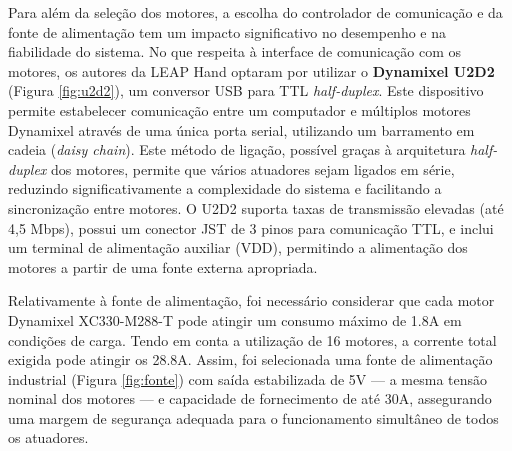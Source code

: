 Para além da seleção dos motores, a escolha do controlador de comunicação e da fonte de alimentação tem um impacto significativo no desempenho e na fiabilidade do sistema. No que respeita à interface de comunicação com os motores, os autores da LEAP Hand \cite{shaw2023leaphand} optaram por utilizar o \textbf{Dynamixel U2D2} (Figura \ref{fig:u2d2}), um conversor USB para TTL \textit{half-duplex}.  Este dispositivo permite estabelecer comunicação entre um computador e múltiplos motores Dynamixel através de uma única porta serial, utilizando um barramento em cadeia (\textit{daisy chain}). Este método de ligação, possível graças à arquitetura \textit{half-duplex} dos motores, permite que vários atuadores sejam ligados em série, reduzindo significativamente a complexidade do sistema e facilitando a sincronização entre motores. O U2D2 suporta taxas de transmissão elevadas (até 4,5 Mbps), possui um conector JST de 3 pinos para comunicação TTL, e inclui um terminal de alimentação auxiliar (VDD), permitindo a alimentação dos motores a partir de uma fonte externa apropriada. 

Relativamente à fonte de alimentação, foi necessário considerar que cada motor Dynamixel XC330-M288-T pode atingir um consumo máximo de 1.8A em condições de carga. Tendo em conta a utilização de 16 motores, a corrente total exigida pode atingir os 28.8A. Assim, foi selecionada uma fonte de alimentação industrial (Figura \ref{fig:fonte}) com saída estabilizada de 5V — a mesma tensão nominal dos motores — e capacidade de fornecimento de até 30A, assegurando uma margem de segurança adequada para o funcionamento simultâneo de todos os atuadores.

